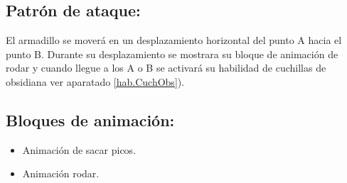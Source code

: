 \subsection{Patrón de ataque:}
El armadillo se moverá en un desplazamiento horizontal del punto A hacia el punto B. Durante su desplazamiento se mostrara su bloque de animación de rodar y cuando llegue a los A o B se activará su habilidad de cuchillas de obsidiana ver aparatado \ref{hab.CuchObs}). 
\subsection{Bloques de animación:}
	\begin{itemize}
		\item Animación de sacar picos.
		\item Animación rodar. 
	\end{itemize}